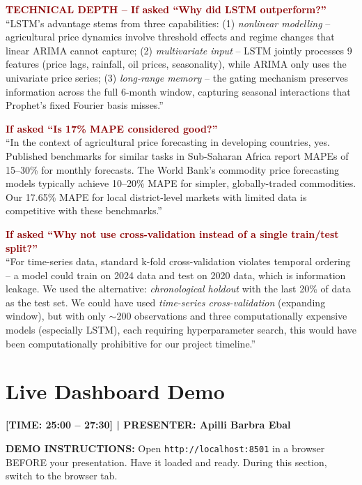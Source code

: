 \documentclass[11pt,a4paper]{article}
\begin{document}
\begin{mdframed}[backgroundcolor=red!5, linecolor=darkred]
\textcolor{darkred}{\textbf{TECHNICAL DEPTH -- If asked ``Why did LSTM outperform?''}}\\
``LSTM's advantage stems from three capabilities: (1) \textit{nonlinear modelling} -- agricultural price dynamics involve threshold effects and regime changes that linear ARIMA cannot capture; (2) \textit{multivariate input} -- LSTM jointly processes 9 features (price lags, rainfall, oil prices, seasonality), while ARIMA only uses the univariate price series; (3) \textit{long-range memory} -- the gating mechanism preserves information across the full 6-month window, capturing seasonal interactions that Prophet's fixed Fourier basis misses.''

\textcolor{darkred}{\textbf{If asked ``Is 17\% MAPE considered good?''}}\\
``In the context of agricultural price forecasting in developing countries, yes. Published benchmarks for similar tasks in Sub-Saharan Africa report MAPEs of 15--30\% for monthly forecasts. The World Bank's commodity price forecasting models typically achieve 10--20\% MAPE for simpler, globally-traded commodities. Our 17.65\% MAPE for local district-level markets with limited data is competitive with these benchmarks.''

\textcolor{darkred}{\textbf{If asked ``Why not use cross-validation instead of a single train/test split?''}}\\
``For time-series data, standard k-fold cross-validation violates temporal ordering -- a model could train on 2024 data and test on 2020 data, which is information leakage. We used the alternative: \textit{chronological holdout} with the last 20\% of data as the test set. We could have used \textit{time-series cross-validation} (expanding window), but with only $\sim$200 observations and three computationally expensive models (especially LSTM), each requiring hyperparameter search, this would have been computationally prohibitive for our project timeline.''
\end{mdframed}

\section{Live Dashboard Demo}
\textcolor{timecolor}{\textbf{[TIME: 25:00 -- 27:30] | PRESENTER: Apilli Barbra Ebal}}

\begin{mdframed}[backgroundcolor=blue!5, linecolor=darkblue]
\textbf{DEMO INSTRUCTIONS:} Open \texttt{http://localhost:8501} in a browser BEFORE your presentation. Have it loaded and ready. During this section, switch to the browser tab.
\end{mdframed}
\end{document}
